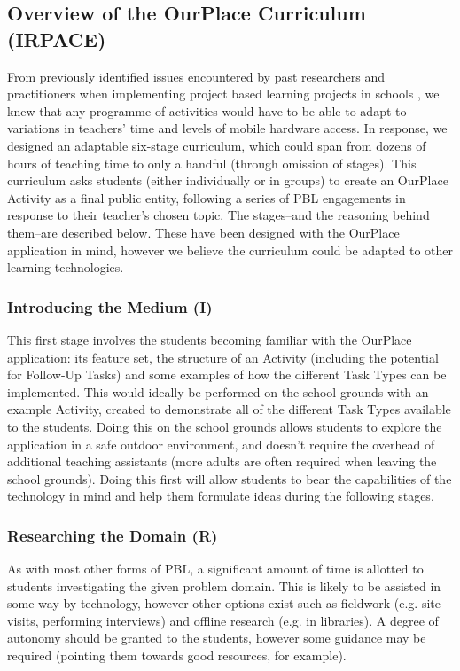 \documentclass[,hyphens]{sigchi}
\begin{document}
\subsection{Overview of the OurPlace Curriculum (IRPACE)}

From previously identified issues encountered by past researchers and practitioners when implementing project based learning projects in schools \cite{Blumenfeld1991, Krajcik2006, InnovationUnit2016, TheEducationEndowmentFoundation2016}, we knew that any programme of activities would have to be able to adapt to variations in teachers' time and levels of mobile hardware access. In response, we designed an adaptable six-stage curriculum, which could span from dozens of hours of teaching time to only a handful (through omission of stages). This curriculum asks students (either individually or in groups) to create an OurPlace Activity as a final public entity, following a series of PBL engagements in response to their teacher's chosen topic. The stages--and the reasoning behind them--are described below. These have been designed with the OurPlace application in mind, however we believe the curriculum could be adapted to other learning technologies.

\subsubsection{Introducing the Medium (I)}
This first stage involves the students becoming familiar with the OurPlace application: its feature set, the structure of an Activity (including the potential for Follow-Up Tasks) and some examples of how the different Task Types can be implemented. This would ideally be performed on the school grounds with an example Activity, created to demonstrate all of the different Task Types available to the students. Doing this on the school grounds allows students to explore the application in a safe outdoor environment, and doesn't require the overhead of additional teaching assistants (more adults are often required when leaving the school grounds). Doing this first will allow students to bear the capabilities of the technology in mind and help them formulate ideas during the following stages.

\subsubsection{Researching the Domain (R)}
As with most other forms of PBL, a significant amount of time is allotted to students investigating the given problem domain. This is likely to be assisted in some way by technology, however other options exist such as fieldwork (e.g. site visits, performing interviews) and offline research (e.g. in libraries). A degree of autonomy should be granted to the students, however some guidance may be required (pointing them towards good resources, for example).
\end{document}
